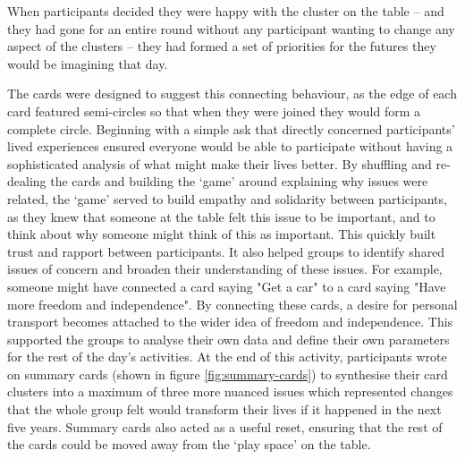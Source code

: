 When participants decided they were happy with the cluster on the table – and they had gone for an entire round without any participant wanting to change any aspect of the clusters – they had formed a set of priorities for the futures they would be imagining that day. 

The cards were designed to suggest this connecting behaviour, as the edge of each card featured semi-circles so that when they were joined they would form a complete circle. Beginning with a simple ask that directly concerned participants' lived experiences ensured everyone would be able to participate without having a sophisticated analysis of what might make their lives better. By shuffling and re-dealing the cards and building the `game' around explaining why issues were related, the `game' served to build empathy and solidarity between participants, as they knew that someone at the table felt this issue to be important, and to think about why someone might think of this as important. This quickly built trust and rapport between participants. It also helped groups to identify shared issues of concern and broaden their understanding of these issues. For example, someone might have connected a card saying "Get a car" to a card saying "Have more freedom and independence". By connecting these cards, a desire for personal transport becomes attached to the wider idea of freedom and independence. This supported the groups to analyse their own data and define their own parameters for the rest of the day's activities. At the end of this activity, participants wrote on summary cards (shown in figure \ref{fig:summary-cards}) to synthesise their card clusters into a maximum of three more nuanced issues which represented changes that the whole group felt would transform their lives if it happened in the next five years. Summary cards also acted as a useful reset, ensuring that the rest of the cards could be moved away from the `play space' on the table.

